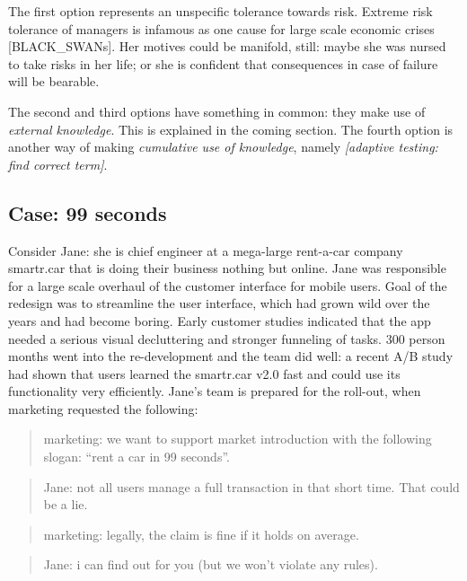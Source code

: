\documentclass[]{svmono}
\begin{document}
The first option represents an unspecific tolerance towards risk.
Extreme risk tolerance of managers is infamous as one cause for large
scale economic crises {[}BLACK\_SWANs{]}. Her motives could be manifold,
still: maybe she was nursed to take risks in her life; or she is
confident that consequences in case of failure will be bearable.

The second and third options have something in common: they make use of
\emph{external knowledge}. This is explained in the coming section. The
fourth option is another way of making \emph{cumulative use of
knowledge}, namely \emph{{[}adaptive testing: find correct term{]}}.

\subsection{Case: 99 seconds}\label{case99}

Consider Jane: she is chief engineer at a mega-large rent-a-car company
smartr.car that is doing their business nothing but online. Jane was
responsible for a large scale overhaul of the customer interface for
mobile users. Goal of the redesign was to streamline the user interface,
which had grown wild over the years and had become boring. Early
customer studies indicated that the app needed a serious visual
decluttering and stronger funneling of tasks. 300 person months went
into the re-development and the team did well: a recent A/B study had
shown that users learned the smartr.car v2.0 fast and could use its
functionality very efficiently. Jane's team is prepared for the
roll-out, when marketing requested the following:

\begin{quote}
marketing: we want to support market introduction with the following
slogan: ``rent a car in 99 seconds''.
\end{quote}

\begin{quote}
Jane: not all users manage a full transaction in that short time. That
could be a lie.
\end{quote}

\begin{quote}
marketing: legally, the claim is fine if it holds on average.
\end{quote}

\begin{quote}
Jane: i can find out for you (but we won't violate any rules).
\end{quote}
\end{document}
